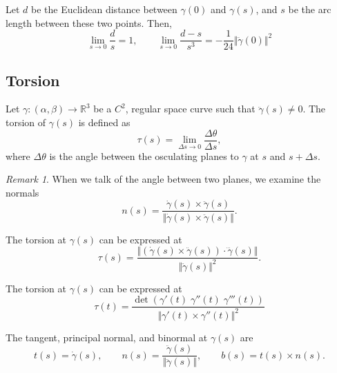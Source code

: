 \documentclass[11pt]{article}
\newcommand{\R}{\mathbb{R}}
\newcommand{\norm}[1]{\Vert #1 \Vert}
\theoremstyle{definition}
\theoremstyle{remark}
\newtheorem*{remark}{Remark}
\numberwithin{equation}{section}
\begin{document}
    \begin{lemma}
        Let $d$ be the Euclidean distance between $\gamma(0)$ and $\gamma(s)$, and
        $s$ be the arc length between these two points. Then, \[
            \lim_{s \to 0} \frac{d}{s} = 1, \qquad \lim_{s \to 0} \frac{d - s}{s^3} =
            -\frac{1}{24}\norm{\ddot{\gamma}(0)}^2
        \] 
    \end{lemma}


    \subsection{Torsion}

    \begin{definition}
        Let $\gamma\colon (\alpha, \beta) \to \R^3$ be a $C^2$, regular space curve
        such that $\ddot{\gamma}(s) \neq 0$. The torsion of $\gamma(s)$ is defined as
        \[
            \tau(s) = \lim_{\Delta s \to 0} \frac{\Delta \theta}{\Delta s},
        \] where $\Delta \theta$ is the angle between the osculating planes to
        $\gamma$ at $s$ and $s + \Delta s$.

        \begin{remark}
            When we talk of the angle between two planes, we examine the normals \[
                n(s) = \frac{\dot{\gamma}(s) \times
                \ddot{\gamma}(s)}{\norm{\dot{\gamma}(s) \times \ddot{\gamma}(s)}}.
            \] 
        \end{remark}
    \end{definition}
    \begin{lemma}
        The torsion at $\gamma(s)$ can be expressed at \[
            \tau(s) = \frac{\norm{(\dot{\gamma}(s) \times \ddot{\gamma}(s))\cdot
            \dddot{\gamma}(s)}}{\norm{\ddot{\gamma}(s)}^2}.
        \] 
    \end{lemma}
    \begin{lemma}
        The torsion at $\gamma(s)$ can be expressed at \[
            \tau(t) = \frac{\det(\gamma'(t)\; \gamma''(t)\;
            \gamma'''(t))}{\norm{\gamma'(t) \times \gamma''(t)}^2}
        \] 
    \end{lemma}

    \begin{definition}
        The tangent, principal normal, and binormal at $\gamma(s)$ are \[
            t(s) = \dot{\gamma}(s), \qquad
            n(s) = \frac{\ddot{\gamma}(s)}{\norm{\ddot{\gamma}(s)}}, \qquad
            b(s) = t(s) \times n(s).
        \] 
    \end{definition}
\end{document}
